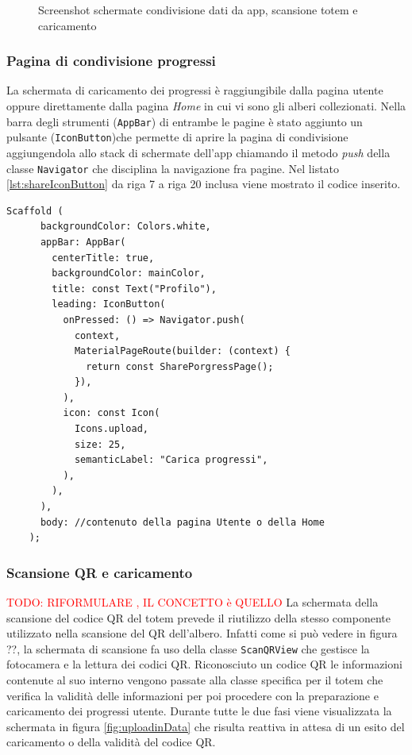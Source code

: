 \begin{figure}[h!]
{        \label{fig:uploadinData}
    } 
    \caption{Screenshot schermate condivisione dati da app, scansione totem e caricamento}
    \label{fig:shareDataApp}
\end{figure}

\subsubsection{Pagina di condivisione progressi}
La schermata di caricamento dei progressi è raggiungibile dalla pagina utente oppure direttamente dalla pagina \textit{Home} in cui vi sono gli alberi collezionati. Nella barra degli strumenti (\texttt{AppBar}) di entrambe le pagine è stato aggiunto un pulsante (\texttt{IconButton})che permette di aprire la pagina di condivisione aggiungendola allo stack di schermate dell'app chiamando il metodo \textit{push} della classe \texttt{Navigator} che disciplina la navigazione fra pagine. Nel listato \ref{lst:shareIconButton} da riga 7 a riga 20 inclusa viene mostrato il codice inserito.

\begin{lstlisting}[style=FlutterStyle, caption={Codice aggiornato della barra degli strumenti dell'app: inserito pulsante per la condivisione dei progressi.}, label={lst:shareIconButton}]
    Scaffold (
      backgroundColor: Colors.white,
      appBar: AppBar(
        centerTitle: true,
        backgroundColor: mainColor, 
        title: const Text("Profilo"),
        leading: IconButton(
          onPressed: () => Navigator.push(
            context,
            MaterialPageRoute(builder: (context) {
              return const SharePorgressPage();
            }),
          ),
          icon: const Icon(
            Icons.upload,
            size: 25,
            semanticLabel: "Carica progressi",
          ),
        ),
      ),
      body: //contenuto della pagina Utente o della Home
    );
\end{lstlisting}

\subsubsection{Scansione QR e caricamento}
\textcolor{red}{TODO: RIFORMULARE , IL CONCETTO è QUELLO}
La schermata della scansione del codice QR del totem prevede il riutilizzo della stesso componente utilizzato nella scansione del QR dell'albero. Infatti come si può vedere in figura ??, la schermata di scansione fa uso della classe \texttt{ScanQRView} che gestisce la fotocamera e la lettura dei codici QR. Riconosciuto un codice QR le informazioni contenute al suo interno vengono passate alla classe specifica per il totem che verifica la validità delle informazioni per poi procedere con la preparazione e caricamento dei progressi utente. Durante tutte le due fasi viene visualizzata la schermata in figura \ref{fig:uploadinData} che risulta reattiva in attesa di un esito del caricamento o della validità del codice QR.


